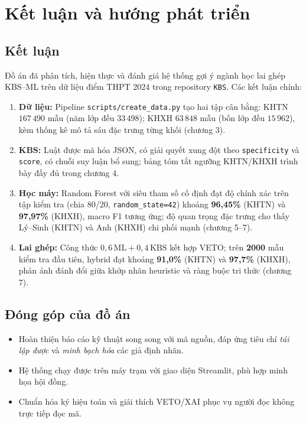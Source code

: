 \chapter{Kết luận và hướng phát triển}

\section{Kết luận}
Đồ án đã phân tích, hiện thực và đánh giá hệ thống gợi ý ngành học lai ghép KBS--ML trên dữ liệu điểm THPT 2024 trong repository \texttt{KBS}. Các kết luận chính:

\begin{enumerate}[leftmargin=*]
  \item \textbf{Dữ liệu:} Pipeline \texttt{scripts/create\_data.py} tạo hai tập cân bằng: KHTN $167\,490$ mẫu (năm lớp đều $33\,498$); KHXH $63\,848$ mẫu (bốn lớp đều $15\,962$), kèm thống kê mô tả sáu đặc trưng từng khối (chương 3).
  \item \textbf{KBS:} Luật được mã hóa JSON, có giải quyết xung đột theo \texttt{specificity} và \texttt{score}, có chuỗi suy luận bổ sung; bảng tóm tắt ngưỡng KHTN/KHXH trình bày đầy đủ trong chương 4.
  \item \textbf{Học máy:} Random Forest với siêu tham số cố định đạt độ chính xác trên tập kiểm tra (chia 80/20, \texttt{random\_state=42}) khoảng \textbf{96,45\%} (KHTN) và \textbf{97,97\%} (KHXH), macro F1 tương ứng; độ quan trọng đặc trưng cho thấy Lý--Sinh (KHTN) và Anh (KHXH) chi phối mạnh (chương 5--7).
  \item \textbf{Lai ghép:} Công thức $0{,}6\,\text{ML}+0{,}4\,\text{KBS}$ kết hợp VETO; trên \textbf{2000} mẫu kiểm tra đầu tiên, hybrid đạt khoảng \textbf{91,0\%} (KHTN) và \textbf{97,7\%} (KHXH), phản ánh đánh đổi giữa khớp nhãn heuristic và ràng buộc tri thức (chương 7).
\end{enumerate}

\section{Đóng góp của đồ án}
\begin{itemize}[leftmargin=*]
  \item Hoàn thiện báo cáo kỹ thuật song song với mã nguồn, đáp ứng tiêu chí \textit{tái lập được} và \textit{minh bạch hóa} các giả định nhãn.
  \item Hệ thống chạy được trên máy trạm với giao diện Streamlit, phù hợp minh họa hội đồng.
  \item Chuẩn hóa ký hiệu toán và giải thích VETO/XAI phục vụ người đọc không trực tiếp đọc mã.
\end{itemize}

